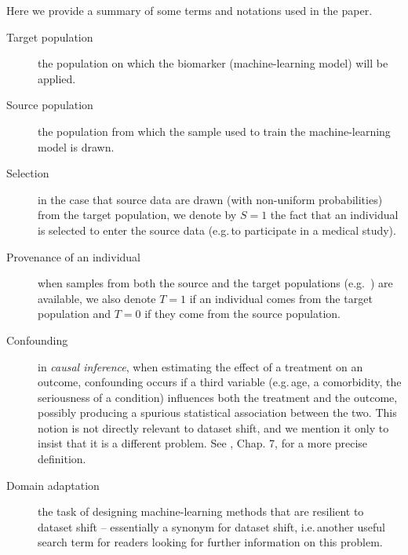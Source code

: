 \documentclass[a4paper,num-refs]{oup-contemporary}
\newcommand{\eg}{e.g.\,}
\newcommand{\ie}{i.e.\,}
\begin{document}
Here we provide a summary of some terms and notations used in the paper.

\begin{description}
  \item [Target population] the population on which the biomarker
    (machine-learning model) will be applied.
  \item [Source population] the population from which the sample used to train
    the machine-learning model is drawn.
  \item [Selection] in the case that source data are drawn (with non-uniform
    probabilities) from the target population, we denote by $S = 1$ the fact
    that an individual is selected to enter the source data (\eg to participate
    in a medical study).
  \item [Provenance of an individual] when samples from
    both the source and the target populations (\eg
    ) are available, we also denote $T=1$ if an individual
    comes from the target population and $T=0$ if they come from the source
    population.
  \item [Confounding] in \emph{causal inference}, when estimating the effect of a treatment on an outcome, confounding occurs if a third variable (\eg age, a comorbidity, the seriousness of a condition) influences both the treatment and the outcome, possibly producing a spurious statistical association between the two.
    This notion is not directly relevant to dataset shift, and we mention it only to insist that it is a different problem.
    See \citet{hernan2020causal}, Chap. 7, for a more precise definition.
  \item [Domain adaptation] the task of designing machine-learning methods that are resilient to dataset shift -- essentially a synonym for dataset shift, \ie another useful search term for readers looking for further information on this problem.
\end{description}
\end{document}
